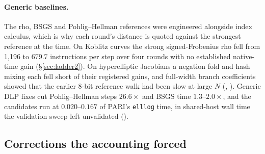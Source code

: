 \paragraph{Generic baselines.} The rho, BSGS and Pohlig--Hellman
references were engineered alongside index calculus, which is why each
round's distance is quoted against the strongest reference at the time. On
Koblitz curves the strong signed-Frobenius rho fell from 1{,}196 to 679.7
instructions per step over four rounds with no established native-time gain
(\S\ref{sec:ladder2}). On hyperelliptic Jacobians a negation fold and hash mixing each fell short
of their registered gains, and full-width branch coefficients showed that
the earlier 8-bit reference walk had been slow at large $N$
(,
).
Generic DLP fixes cut Pohlig--Hellman steps $26.6\times$ and BSGS time
$1.3$--$2.0\times$, and the candidates run at $0.020$--$0.167$ of PARI's
\texttt{elllog} time, in shared-host wall time the validation sweep left
unvalidated ().

\subsection{Corrections the accounting forced}\label{sec:corrections}

